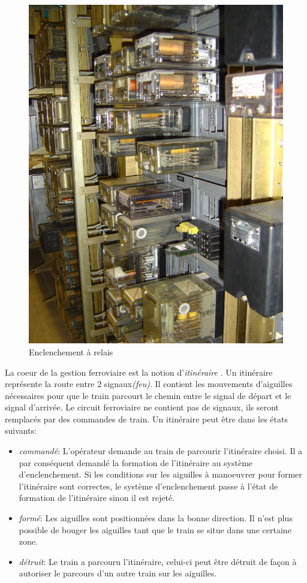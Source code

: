 \begin{figure}[ht]
\begin{minipage}[c]{.46\linewidth}
        \includegraphics[scale=0.075]{enclenchement_relais.jpg}
        \caption{Enclenchement à relais}
        \label{relais}
    \end{minipage}
\end{figure}


La coeur de la gestion
  ferroviaire est la notion d'\emph{itinéraire} \cite{siteferro}. Un itinéraire
  représente la route entre 2 signaux\emph{(feu)}. Il contient les mouvements
  d'aiguilles nécessaires pour que le train parcourt le chemin entre le
  signal de départ et le signal d'arrivée. Le circuit ferroviaire ne
  contient pas de signaux, ils seront remplacés par des commandes de
  train. Un itinéraire peut être dans les états suivants:
  \begin{itemize}
  \item \emph{commandé}: L'opérateur demande au train de parcourir
      l'itinéraire choisi. Il a par conséquent demandé la formation de
      l'itinéraire au système d'enclenchement. Si les conditions sur
      les aiguilles à manoeuvrer pour former l'itinéraire sont
      correctes, le système d'enclenchement passe à l'état de formation de
      l'itinéraire sinon il est rejeté.
  \item \emph{formé}: Les aiguilles sont positionnées dans la bonne
      direction. Il n'est plus possible de bouger les aiguilles tant
      que le train se situe dans une certaine zone.
  \item \emph{détruit}: Le train a parcouru l'itinéraire, celui-ci peut
      être détruit de façon à autoriser le parcours d'un autre train sur les
      aiguilles.  
  \end{itemize}

